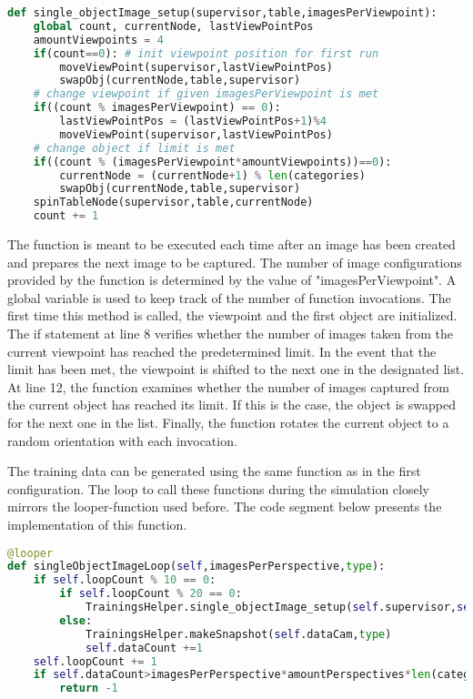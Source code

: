 \begin{lstlisting}[language=python]
def single_objectImage_setup(supervisor,table,imagesPerViewpoint):
    global count, currentNode, lastViewPointPos
    amountViewpoints = 4
    if(count==0): # init viewpoint position for first run
        moveViewPoint(supervisor,lastViewPointPos)
        swapObj(currentNode,table,supervisor)
    # change viewpoint if given imagesPerViewpoint is met
    if((count % imagesPerViewpoint) == 0):
        lastViewPointPos = (lastViewPointPos+1)%4
        moveViewPoint(supervisor,lastViewPointPos)
    # change object if limit is met
    if((count % (imagesPerViewpoint*amountViewpoints))==0):
        currentNode = (currentNode+1) % len(categories)
        swapObj(currentNode,table,supervisor)
    spinTableNode(supervisor,table,currentNode)
    count += 1
\end{lstlisting}
The function is meant to be executed each time after an image has been created and prepares the next image to be captured. The number of image configurations provided by the function is determined by the value of "imagesPerViewpoint". A global variable is used to keep track of the number of function invocations. The first time this method is called, the viewpoint and the first object are initialized. The if statement at line 8 verifies whether the number of images taken from the current viewpoint has reached the predetermined limit. In the event that the limit has been met, the viewpoint is shifted to the next one in the designated list. At line 12, the function examines whether the number of images captured from the current object has reached its limit. If this is the case, the object is swapped for the next one in the list. Finally, the function rotates the current object to a random orientation with each invocation. 

The training data can be generated using the same function as in the first configuration. The loop to call these functions during the simulation closely mirrors the looper-function used before. The code segment below presents the implementation of this function. 

\begin{lstlisting}[language=python]	
@looper
def singleObjectImageLoop(self,imagesPerPerspective,type):
    if self.loopCount % 10 == 0:
        if self.loopCount % 20 == 0:
            TrainingsHelper.single_objectImage_setup(self.supervisor,self.mainTable,imagesPerPerspective)
        else:
            TrainingsHelper.makeSnapshot(self.dataCam,type)
            self.dataCount +=1
    self.loopCount += 1
    if self.dataCount>imagesPerPerspective*amountPerspectives*len(categories): 
        return -1
\end{lstlisting}

